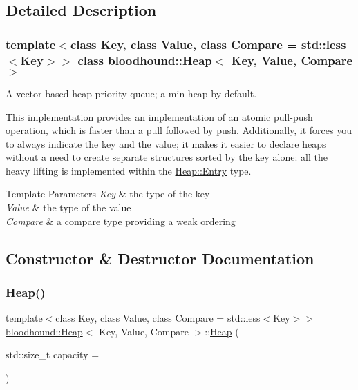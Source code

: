 \subsection{Detailed Description}
\subsubsection*{template$<$class Key, class Value, class Compare = std\+::less$<$\+Key$>$$>$\newline
class bloodhound\+::\+Heap$<$ Key, Value, Compare $>$}

A vector-\/based heap priority queue; a min-\/heap by default.

This implementation provides an implementation of an atomic pull-\/push operation, which is faster than a pull followed by push. Additionally, it forces you to always indicate the key and the value; it makes it easier to declare heaps without a need to create separate structures sorted by the key alone\+: all the heavy lifting is implemented within the \hyperlink{structbloodhound_1_1Heap_1_1Entry}{Heap\+::\+Entry} type.


\begin{DoxyTemplParams}{Template Parameters}
{\em Key} & the type of the key \\
\hline
{\em Value} & the type of the value \\
\hline
{\em Compare} & a compare type providing a weak ordering \\
\hline
\end{DoxyTemplParams}


\subsection{Constructor \& Destructor Documentation}
\mbox{\label{classbloodhound_1_1Heap_a4bfb303b963ce1fb618fe52f1c594548}} 
\subsubsection{\texorpdfstring{Heap()}{Heap()}}
{\footnotesize\ttfamily template$<$class Key, class Value, class Compare = std\+::less$<$\+Key$>$$>$ \\
\hyperlink{classbloodhound_1_1Heap}{bloodhound\+::\+Heap}$<$ Key, Value, Compare $>$\+::\hyperlink{classbloodhound_1_1Heap}{Heap} (\begin{DoxyParamCaption}\item[{std\+::size\+\_\+t}]{capacity = {} }\end{DoxyParamCaption})\hspace{0.3cm}{\ttfamily [inline]}}

